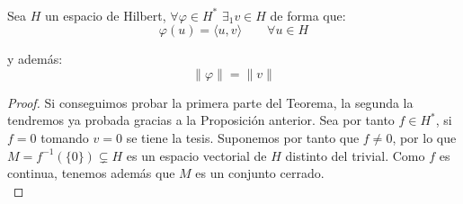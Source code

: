 \begin{teo}\ \\
    Sea $H$ un espacio de Hilbert, $\forall \varphi\in H^\ast$ $\exists _1 v\in H$ de forma que:
    \begin{equation*}
        \varphi(u) = \langle u,v \rangle  \qquad \forall u\in H
    \end{equation*}

    y además:
    \begin{equation*}
        \|\varphi\| = \|v\|
    \end{equation*}
    \begin{proof}
        Si conseguimos probar la primera parte del Teorema, la segunda la tendremos ya probada gracias a la Proposición anterior. Sea por tanto $f\in H^\ast$, si $f=0$ tomando $v=0$ se tiene la tesis. Suponemos por tanto que $f\neq 0$, por lo que $M = f^{-1}(\{0\})\subsetneq H$ es un espacio vectorial de $H$ distinto del trivial. Como $f$ es continua, tenemos además que $M$ es un conjunto cerrado.\\


\end{proof}
\end{teo}
